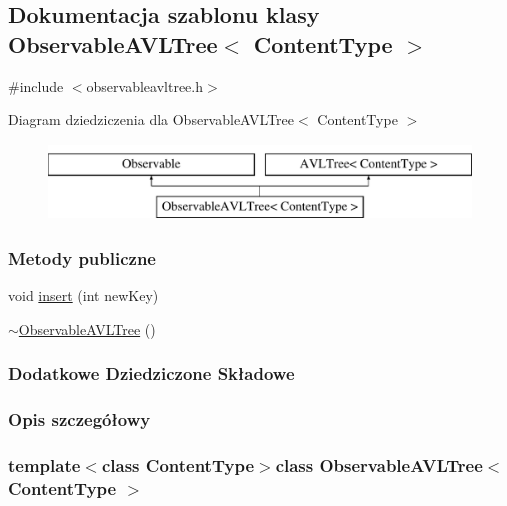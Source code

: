 \hypertarget{class_observable_a_v_l_tree}{\subsection{Dokumentacja szablonu klasy Observable\-A\-V\-L\-Tree$<$ Content\-Type $>$}
\label{class_observable_a_v_l_tree}
}


{\ttfamily \#include $<$observableavltree.\-h$>$}

Diagram dziedziczenia dla Observable\-A\-V\-L\-Tree$<$ Content\-Type $>$\begin{figure}[H]
\begin{center}
\leavevmode
\includegraphics[height=2.000000cm]{class_observable_a_v_l_tree}
\end{center}
\end{figure}
\subsubsection*{Metody publiczne}
\begin{DoxyCompactItemize}
\item 
void \hyperlink{class_observable_a_v_l_tree_a0db0ebff3adb2ffb7d98bb2efbc9c3a9}{insert} (int new\-Key)
\item 
\hyperlink{class_observable_a_v_l_tree_aabd578193ef4e285e113abe9547b3600}{$\sim$\-Observable\-A\-V\-L\-Tree} ()
\end{DoxyCompactItemize}
\subsubsection*{Dodatkowe Dziedziczone Składowe}


\subsubsection{Opis szczegółowy}
\subsubsection*{template$<$class Content\-Type$>$class Observable\-A\-V\-L\-Tree$<$ Content\-Type $>$}




